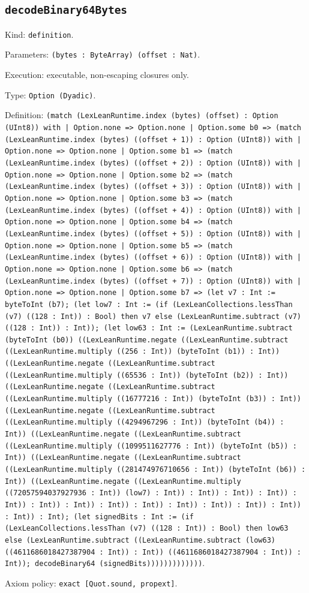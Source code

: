 \documentclass[11pt]{article}
\begin{document}
\subsection*{\texttt{decodeBinary64Bytes}}
\noindent Kind: \texttt{definition}.\par
\noindent Parameters: \texttt{(bytes : ByteArray) (offset : Nat)}.\par
\noindent Execution: executable, non-escaping closures only.\par
\noindent Type: \texttt{Option (Dyadic)}.\par
\noindent Definition: \texttt{(match (LexLeanRuntime.index (bytes) (offset) : Option (UInt8)) with | Option.none => Option.none | Option.some b0 => (match (LexLeanRuntime.index (bytes) ((offset + 1)) : Option (UInt8)) with | Option.none => Option.none | Option.some b1 => (match (LexLeanRuntime.index (bytes) ((offset + 2)) : Option (UInt8)) with | Option.none => Option.none | Option.some b2 => (match (LexLeanRuntime.index (bytes) ((offset + 3)) : Option (UInt8)) with | Option.none => Option.none | Option.some b3 => (match (LexLeanRuntime.index (bytes) ((offset + 4)) : Option (UInt8)) with | Option.none => Option.none | Option.some b4 => (match (LexLeanRuntime.index (bytes) ((offset + 5)) : Option (UInt8)) with | Option.none => Option.none | Option.some b5 => (match (LexLeanRuntime.index (bytes) ((offset + 6)) : Option (UInt8)) with | Option.none => Option.none | Option.some b6 => (match (LexLeanRuntime.index (bytes) ((offset + 7)) : Option (UInt8)) with | Option.none => Option.none | Option.some b7 => (let v7 : Int := byteToInt (b7); (let low7 : Int := (if (LexLeanCollections.lessThan (v7) ((128 : Int)) : Bool) then v7 else (LexLeanRuntime.subtract (v7) ((128 : Int)) : Int)); (let low63 : Int := (LexLeanRuntime.subtract (byteToInt (b0)) ((LexLeanRuntime.negate ((LexLeanRuntime.subtract ((LexLeanRuntime.multiply ((256 : Int)) (byteToInt (b1)) : Int)) ((LexLeanRuntime.negate ((LexLeanRuntime.subtract ((LexLeanRuntime.multiply ((65536 : Int)) (byteToInt (b2)) : Int)) ((LexLeanRuntime.negate ((LexLeanRuntime.subtract ((LexLeanRuntime.multiply ((16777216 : Int)) (byteToInt (b3)) : Int)) ((LexLeanRuntime.negate ((LexLeanRuntime.subtract ((LexLeanRuntime.multiply ((4294967296 : Int)) (byteToInt (b4)) : Int)) ((LexLeanRuntime.negate ((LexLeanRuntime.subtract ((LexLeanRuntime.multiply ((1099511627776 : Int)) (byteToInt (b5)) : Int)) ((LexLeanRuntime.negate ((LexLeanRuntime.subtract ((LexLeanRuntime.multiply ((281474976710656 : Int)) (byteToInt (b6)) : Int)) ((LexLeanRuntime.negate ((LexLeanRuntime.multiply ((72057594037927936 : Int)) (low7) : Int)) : Int)) : Int)) : Int)) : Int)) : Int)) : Int)) : Int)) : Int)) : Int)) : Int)) : Int)) : Int)) : Int)) : Int); (let signedBits : Int := (if (LexLeanCollections.lessThan (v7) ((128 : Int)) : Bool) then low63 else (LexLeanRuntime.subtract ((LexLeanRuntime.subtract (low63) ((4611686018427387904 : Int)) : Int)) ((4611686018427387904 : Int)) : Int)); decodeBinary64 (signedBits)))))))))))))}.\par
\noindent Axiom policy: \texttt{exact [Quot.sound, propext]}.\par
\end{document}
